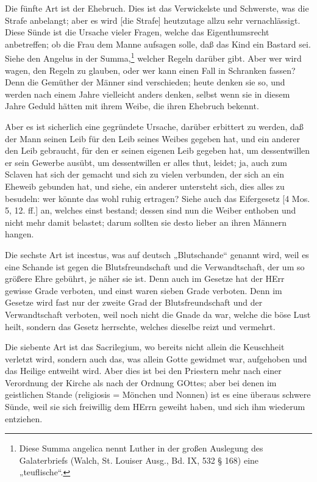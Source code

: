 Die fünfte Art ist der Ehebruch. Dies ist das Verwickelste und Schwerste, was die Strafe anbelangt; aber es wird [die Strafe] heutzutage allzu sehr vernachlässigt. Diese Sünde ist die Ursache vieler Fragen, welche das Eigenthumsrecht anbetreffen; ob die Frau dem Manne aufsagen solle, daß das Kind ein Bastard sei. Siehe den Angelus in der Summa,\footnote{Diese Summa angelica nennt Luther in der großen Auslegung des Galaterbriefs (Walch, St. Louiser Ausg., Bd. IX, 532 § 168) eine „teuflische“.} welcher Regeln darüber gibt. Aber wer wird wagen, den Regeln zu glauben, oder wer kann einen Fall in Schranken fassen? Denn die Gemüther der Männer sind verschieden; heute denken sie so, und werden nach einem Jahre vielleicht anders denken, selbst wenn sie in diesem Jahre Geduld hätten mit ihrem Weibe, die ihren Ehebruch bekennt.

Aber es ist sicherlich eine gegründete Ursache, darüber erbittert zu werden, daß der Mann seinen Leib für den Leib seines Weibes gegeben hat, und ein anderer den Leib gebraucht, für den er seinen eigenen Leib gegeben hat, um dessentwillen er sein Gewerbe ausübt, um dessentwillen er alles thut, leidet; ja, auch zum Sclaven hat sich der gemacht und sich zu vielen verbunden, der sich an ein Eheweib gebunden hat, und siehe, ein anderer untersteht sich, dies alles zu besudeln: wer könnte das wohl ruhig ertragen? Siehe auch das Eifergesetz [4 Mos. 5, 12. ff.] an, welches einst bestand; dessen sind nun die Weiber enthoben und nicht mehr damit belastet; darum sollten sie desto lieber an ihren Männern hangen.

Die sechste Art ist incestus, was auf deutsch „Blutschande“ genannt wird, weil es eine Schande ist gegen die Blutsfreundschaft und die Verwandtschaft, der um so größere Ehre gebührt, je näher sie ist. Denn auch im Gesetze hat der HErr gewisse Grade verboten, und einst waren sieben Grade verboten. Denn im Gesetze wird fast nur der zweite Grad der Blutsfreundschaft und der Verwandtschaft verboten, weil noch nicht die Gnade da war, welche die böse Lust heilt, sondern das Gesetz herrschte, welches dieselbe reizt und vermehrt.

Die siebente Art ist das Sacrilegium, wo bereits nicht allein die Keuschheit verletzt wird, sondern auch das, was allein Gotte gewidmet war, aufgehoben und das Heilige entweiht wird. Aber dies ist bei den Priestern mehr nach einer Verordnung der Kirche als nach der Ordnung GOttes; aber bei denen im geistlichen Stande (religiosis = Mönchen und Nonnen) ist es eine überaus schwere Sünde, weil sie sich freiwillig dem HErrn geweiht haben, und sich ihm wiederum entziehen.


